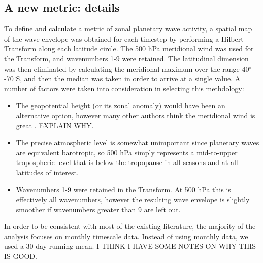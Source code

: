 \subsection{A new metric: details}

To define and calculate a metric of zonal planetary wave activity, a spatial map of the wave envelope was obtained for each timestep by performing a Hilbert Transform along each latitude circle. The 500 hPa meridional wind was used for the Transform, and wavenumbers 1-9 were retained. The latitudinal dimension was then eliminated by calculating the meridional maximum over the range 40$^{\circ}$-70$^{\circ}$S, and then the median was taken in order to arrive at a single value. A number of factors were taken into consideration in selecting this methdology:
\begin{itemize}
\item The geopotential height (or its zonal anomaly) would have been an alternative option, however many other authors think the meridional wind is great \citep[e.g.]{Hope2014}. EXPLAIN WHY.
\item The precise atmospheric level is somewhat unimportant since planetary waves are equivalent barotropic, so 500 hPa simply represents a mid-to-upper tropospheric level that is below the tropopause in all seasons and at all latitudes of interest.
\item Wavenumbers 1-9 were retained in the Transform. At 500 hPa this is effectively all wavenumbers, however the resulting wave envelope is slightly smoother if wavenumbers greater than 9 are left out.
\end{itemize}

In order to be consistent with most of the existing literature, the majority of the analysis focuses on monthly timescale data. Instead of using monthly data, we used a 30-day running mean. I THINK I HAVE SOME NOTES ON WHY THIS IS GOOD.


